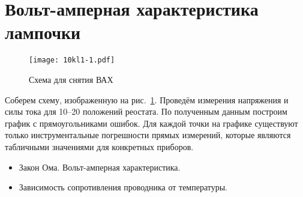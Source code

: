 \section{Вольт-амперная характеристика лампочки}
\begin{figure}
\end{figure}
\SolveVariant
\begin{figure}[h]
    \centering
    \texttt{[image: 10kl1-1.pdf]}
    \caption{Схема для снятия ВАХ}
    \label{fig:10kl-vah:scheme}
\end{figure}
Соберем схему, изображенную на рис.~\ref{fig:10kl-vah:scheme}. Проведём измерения напряжения и силы тока для 10--20 положений реостата. По полученным данным построим график с прямоугольниками ошибок.
\MesErrors
Для каждой точки на графике существуют только инструментальные погрешности прямых измерений, которые являются табличными значениями для конкретных приборов.
\SchoolBase
\begin{itemize}
    \item Закон Ома. Вольт-амперная характеристика.
    \item Зависимость сопротивления проводника от температуры. 
\end{itemize}
\AdditionalQuestions
